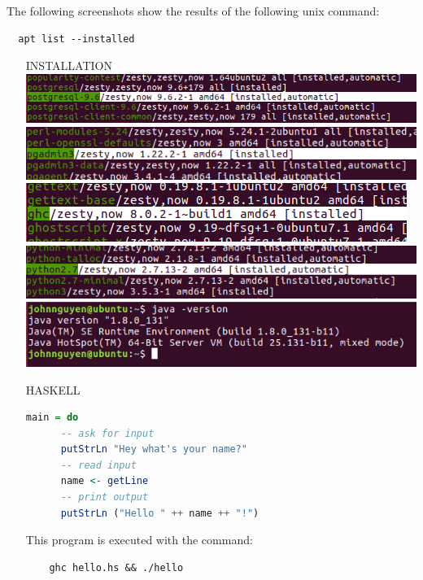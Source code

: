 \documentclass[12pt]{report}
\begin{document}
\vspace{1cm}
The following screenshots show the results of the following unix command:
\begin{verbatim}
  apt list --installed
\end{verbatim}
\begin{enumerate}
  \item [INSTALLATION]
  \includegraphics[scale = 0.5]{postgres}\\
  \includegraphics[scale = 0.5]{pgadmin}\\
  \includegraphics[scale = 0.5]{haskell}\\
  \includegraphics[scale = 0.5]{python}\\
  \includegraphics[scale = 0.5]{java}\\

  \item [HASKELL]
  \begin{lstlisting}[language = Haskell]
    main = do
      -- ask for input
      putStrLn "Hey what's your name?"
      -- read input
      name <- getLine
      -- print output
      putStrLn ("Hello " ++ name ++ "!")
  \end{lstlisting}

  This program is executed with the command:
  \begin{verbatim}
    ghc hello.hs && ./hello
  \end{verbatim}
  \vspace{1.5cm}


\end{enumerate}
\end{document}
